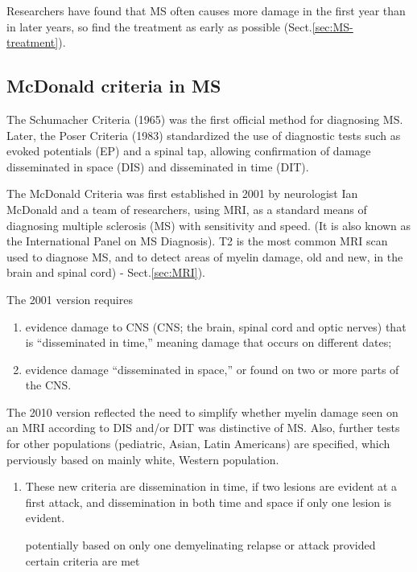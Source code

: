 Researchers have found that MS often causes more damage in the first year than
in later years, so find the treatment as early as possible
(Sect.\ref{sec:MS-treatment}).

\subsection{McDonald criteria in MS}
\label{sec:MS-McDonald-criteria}
\label{sec:McDonald-criteria-in-MS}

The Schumacher Criteria (1965) was the first official method for diagnosing MS.
Later, the Poser Criteria (1983) standardized the use of diagnostic tests such
as evoked potentials (EP) and a spinal tap, allowing confirmation of damage
disseminated in space (DIS) and disseminated in time (DIT).



The McDonald Criteria was first established in 2001 by neurologist Ian McDonald
and a team of researchers, using MRI, as a standard means of diagnosing multiple
sclerosis (MS) with sensitivity and speed. (It is also known as the
International Panel on MS Diagnosis). T2 is the most common MRI scan used to
diagnose MS, and to detect areas of myelin damage, old and new, in the brain and
spinal cord) - Sect.\ref{sec:MRI}).

The 2001 version requires
\begin{enumerate}
  \item evidence damage to CNS
  (CNS; the brain, spinal cord and optic nerves) that is “disseminated in time,” meaning damage that occurs on different dates;
  
  \item evidence damage “disseminated in space,” or found on two or more parts of the CNS.
\end{enumerate}


The 2010 version reflected the need to simplify whether myelin damage seen on an
MRI according to DIS and/or DIT was distinctive of MS. Also, further tests for
other populations (pediatric, Asian, Latin Americans) are specified, which
perviously based on mainly white, Western population.


\begin{enumerate}
  
  \item  These new criteria are dissemination in time, if two lesions are
  evident at a first attack, and dissemination in both time and space if only
  one lesion is evident.
  
  potentially based on only one demyelinating relapse or attack provided certain criteria are met
  
\end{enumerate}



